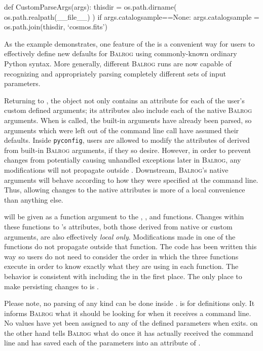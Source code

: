 \documentclass[11pt]{book}
\newcommand{\codett}[1]{\lstinline{#1}}
\newcommand{\py}{Python}
\newcommand{\pyconfig}{\codett{pyconfig}}
\newcommand{\balrog}{\textsc{Balrog}}
\begin{document}
\begin{code}
def CustomParseArgs(args):
    thisdir = os.path.dirname( os.path.realpath(__file__) )
    if args.catalogsample==None:
        args.catalogsample = os.path.join(thisdir, `cosmos.fits')
\end{code}

\noindent As the example demonstrates, one feature of the \parsefunc{} is a convenient
way for users to effectively define new defaults for \balrog{} using
commonly-known ordinary \py{} syntax.
More generally, different \balrog{} runs are now capable of recognizing and appropriately parsing
completely different sets of input parameters. 

Returning to \parseargs{},
the object not only contains an attribute for each of the user's custom defined arguments;
its attributes also include each of the native \balrog{} arguments.
When \parsefunc{} is called, the built-in arguments have already been parsed,
so arguments which were left out of the command line call have assumed their defaults.
Inside \pyconfig{}, users are allowed to modify the attributes of \parseargs{} derived from built-in \balrog{} arguments, 
if they so desire.
However, in order to prevent changes from potentially causing unhandled exceptions later in \balrog{},
any modifications will not propagate outside \parsefunc{}.
Downstream, \balrog{}'s native arguments will behave according to how they were specified at the command line.
Thus, allowing changes to the native attributes is more of a local convenience than anything else.

\parseargs{} will be given as a function argument to the \simfunc{}, \gspfunc, and \sexfunc{} functions.
Changes within these functions to \parseargs{}'s attributes, both those derived from native or custom arguments,
are also effectively \emph{local only}.
Modifications made in one of the functions do not propagate outside that function.
The code has been written this way so users do not need to consider the order in which the three functions execute
in order to know exactly what \parseargs{} they are using in each function.
The behavior is consistent with including the \parsefunc{} in the first place.
The only place to make persisting changes to \parseargs{} is \parsefunc{}.

Please note, no parsing of any kind can be done inside \argsfunc{}.
\argsfunc{} is for definitions only.
It informs \balrog{} what it should be looking for when it receives a command line.
No values have yet been assigned to any of the defined parameters when \argsfunc{} exits.
\parsefunc{} on the other hand tells \balrog{} what do once it has actually received the command line
and has saved each of the parameters into an attribute of \parseargs{}.
\end{document}
